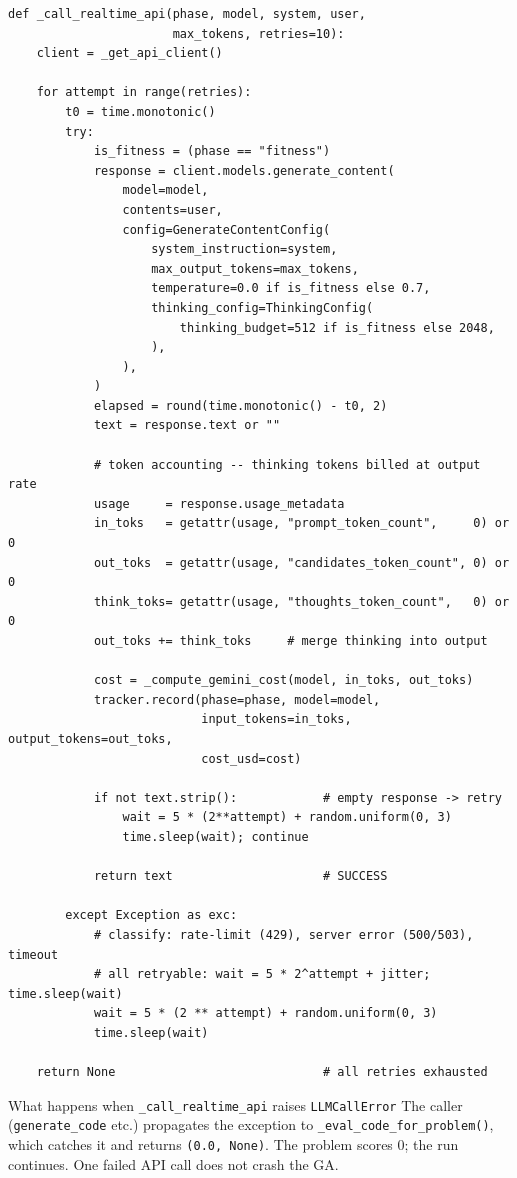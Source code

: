 \documentclass[11pt,a4paper]{report}
\newcommand{\fn}[1]{\texttt{#1}}
\begin{document}
\begin{lstlisting}[style=py, caption={\_call\_realtime\_api() -- Vertex AI invocation (abridged)}]
def _call_realtime_api(phase, model, system, user,
                       max_tokens, retries=10):
    client = _get_api_client()

    for attempt in range(retries):
        t0 = time.monotonic()
        try:
            is_fitness = (phase == "fitness")
            response = client.models.generate_content(
                model=model,
                contents=user,
                config=GenerateContentConfig(
                    system_instruction=system,
                    max_output_tokens=max_tokens,
                    temperature=0.0 if is_fitness else 0.7,
                    thinking_config=ThinkingConfig(
                        thinking_budget=512 if is_fitness else 2048,
                    ),
                ),
            )
            elapsed = round(time.monotonic() - t0, 2)
            text = response.text or ""

            # token accounting -- thinking tokens billed at output rate
            usage     = response.usage_metadata
            in_toks   = getattr(usage, "prompt_token_count",     0) or 0
            out_toks  = getattr(usage, "candidates_token_count", 0) or 0
            think_toks= getattr(usage, "thoughts_token_count",   0) or 0
            out_toks += think_toks     # merge thinking into output

            cost = _compute_gemini_cost(model, in_toks, out_toks)
            tracker.record(phase=phase, model=model,
                           input_tokens=in_toks, output_tokens=out_toks,
                           cost_usd=cost)

            if not text.strip():            # empty response -> retry
                wait = 5 * (2**attempt) + random.uniform(0, 3)
                time.sleep(wait); continue

            return text                     # SUCCESS

        except Exception as exc:
            # classify: rate-limit (429), server error (500/503), timeout
            # all retryable: wait = 5 * 2^attempt + jitter; time.sleep(wait)
            wait = 5 * (2 ** attempt) + random.uniform(0, 3)
            time.sleep(wait)

    return None                             # all retries exhausted
\end{lstlisting}

\begin{concept}{What happens when \fn{\_call\_realtime\_api} raises \fn{LLMCallError}}
The caller (\fn{generate\_code} etc.) propagates the exception to
\fn{\_eval\_code\_for\_problem()}, which catches it and returns \fn{(0.0, None)}.
The problem scores 0; the run continues.  One failed API call does not crash the GA.
\end{concept}
\end{document}

